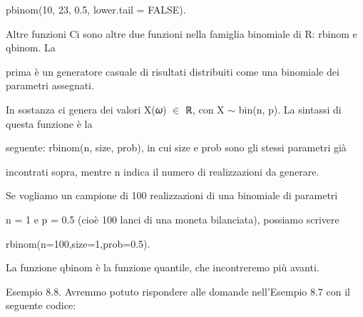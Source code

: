 \documentclass[a4paper,portrait,12pt]{article}
\begin{document}
\begin{flushleft}
pbinom(10, 23, 0.5, lower.tail = FALSE).
\end{flushleft}


\begin{flushleft}
Altre funzioni Ci sono altre due funzioni nella famiglia binomiale di R: rbinom e qbinom. La
\end{flushleft}


\begin{flushleft}
prima \`{e} un generatore casuale di risultati distribuiti come una binomiale dei parametri assegnati.
\end{flushleft}


\begin{flushleft}
In sostanza ci genera dei valori X(𝜔) $\in$ ℝ, con X $\sim$ bin(n, p). La sintassi di questa funzione \`{e} la
\end{flushleft}


\begin{flushleft}
seguente: rbinom(n, size, prob), in cui size e prob sono gli stessi parametri gi\`{a}
\end{flushleft}


\begin{flushleft}
incontrati sopra, mentre n indica il numero di realizzazioni da generare.
\end{flushleft}


\begin{flushleft}
Se vogliamo un campione di 100 realizzazioni di una binomiale di parametri
\end{flushleft}


\begin{flushleft}
n = 1 e p = 0.5 (cio\`{e} 100 lanci di una moneta bilanciata), possiamo scrivere
\end{flushleft}


\begin{flushleft}
rbinom(n=100,size=1,prob=0.5).
\end{flushleft}


\begin{flushleft}
La funzione qbinom \`{e} la funzione quantile, che incontreremo più avanti.
\end{flushleft}


\begin{flushleft}
Esempio 8.8. Avremmo potuto rispondere alle domande nell'Esempio 8.7 con il seguente codice:
\end{flushleft}
\end{document}
